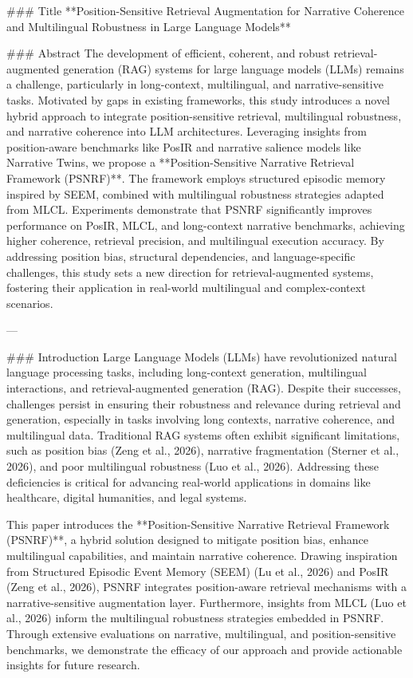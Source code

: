 ### Title
**Position-Sensitive Retrieval Augmentation for Narrative Coherence and Multilingual Robustness in Large Language Models**

### Abstract
The development of efficient, coherent, and robust retrieval-augmented generation (RAG) systems for large language models (LLMs) remains a challenge, particularly in long-context, multilingual, and narrative-sensitive tasks. Motivated by gaps in existing frameworks, this study introduces a novel hybrid approach to integrate position-sensitive retrieval, multilingual robustness, and narrative coherence into LLM architectures. Leveraging insights from position-aware benchmarks like PosIR and narrative salience models like Narrative Twins, we propose a **Position-Sensitive Narrative Retrieval Framework (PSNRF)**. The framework employs structured episodic memory inspired by SEEM, combined with multilingual robustness strategies adapted from MLCL. Experiments demonstrate that PSNRF significantly improves performance on PosIR, MLCL, and long-context narrative benchmarks, achieving higher coherence, retrieval precision, and multilingual execution accuracy. By addressing position bias, structural dependencies, and language-specific challenges, this study sets a new direction for retrieval-augmented systems, fostering their application in real-world multilingual and complex-context scenarios.

---

### Introduction
Large Language Models (LLMs) have revolutionized natural language processing tasks, including long-context generation, multilingual interactions, and retrieval-augmented generation (RAG). Despite their successes, challenges persist in ensuring their robustness and relevance during retrieval and generation, especially in tasks involving long contexts, narrative coherence, and multilingual data. Traditional RAG systems often exhibit significant limitations, such as position bias (Zeng et al., 2026), narrative fragmentation (Sterner et al., 2026), and poor multilingual robustness (Luo et al., 2026). Addressing these deficiencies is critical for advancing real-world applications in domains like healthcare, digital humanities, and legal systems.

This paper introduces the **Position-Sensitive Narrative Retrieval Framework (PSNRF)**, a hybrid solution designed to mitigate position bias, enhance multilingual capabilities, and maintain narrative coherence. Drawing inspiration from Structured Episodic Event Memory (SEEM) (Lu et al., 2026) and PosIR (Zeng et al., 2026), PSNRF integrates position-aware retrieval mechanisms with a narrative-sensitive augmentation layer. Furthermore, insights from MLCL (Luo et al., 2026) inform the multilingual robustness strategies embedded in PSNRF. Through extensive evaluations on narrative, multilingual, and position-sensitive benchmarks, we demonstrate the efficacy of our approach and provide actionable insights for future research.

